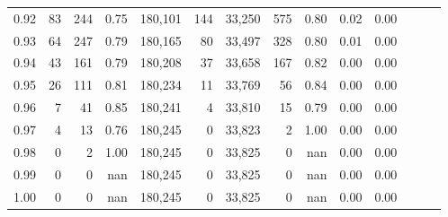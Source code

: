 \begin{tabular}{rrrrrrrrrrrrrr}
0.92 &     83 &  244 &  0.75 &  180,101 &      144 &  33,250 &     575 &  0.80 &  0.02 &      0.00 \\
0.93 &     64 &  247 &  0.79 &  180,165 &       80 &  33,497 &     328 &  0.80 &  0.01 &      0.00 \\
0.94 &     43 &  161 &  0.79 &  180,208 &       37 &  33,658 &     167 &  0.82 &  0.00 &      0.00 \\
0.95 &     26 &  111 &  0.81 &  180,234 &       11 &  33,769 &      56 &  0.84 &  0.00 &      0.00 \\
0.96 &      7 &   41 &  0.85 &  180,241 &        4 &  33,810 &      15 &  0.79 &  0.00 &      0.00 \\
0.97 &      4 &   13 &  0.76 &  180,245 &        0 &  33,823 &       2 &  1.00 &  0.00 &      0.00 \\
0.98 &      0 &    2 &  1.00 &  180,245 &        0 &  33,825 &       0 &   nan &  0.00 &      0.00 \\
0.99 &      0 &    0 &   nan &  180,245 &        0 &  33,825 &       0 &   nan &  0.00 &      0.00 \\
1.00 &      0 &    0 &   nan &  180,245 &        0 &  33,825 &       0 &   nan &  0.00 &      0.00 \\
\bottomrule
\end{tabular}
